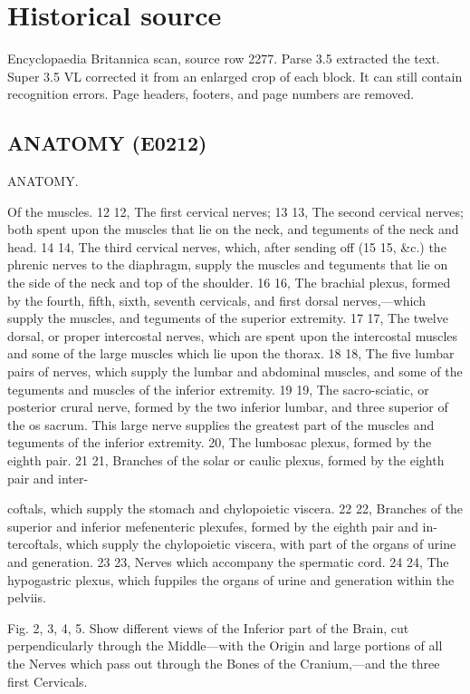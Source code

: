 \documentclass{article}
\begin{document}
\section*{Historical source}
Encyclopaedia Britannica scan, source row 2277. Parse 3.5 extracted the text. Super 3.5 VL corrected it from an enlarged crop of each block. It can still contain recognition errors.
Page headers, footers, and page numbers are removed.

\subsection*{ANATOMY (E0212)}
ANATOMY.

Of the muscles. 12 12, The first cervical nerves; 13 13, The second cervical nerves; both spent upon the muscles that lie on the neck, and teguments of the neck and head. 14 14, The third cervical nerves, which, after sending off (15 15, \&c.) the phrenic nerves to the diaphragm, supply the muscles and teguments that lie on the side of the neck and top of the shoulder. 16 16, The brachial plexus, formed by the fourth, fifth, sixth, seventh cervicals, and first dorsal nerves,—which supply the muscles, and teguments of the superior extremity. 17 17, The twelve dorsal, or proper intercostal nerves, which are spent upon the intercostal muscles and some of the large muscles which lie upon the thorax. 18 18, The five lumbar pairs of nerves, which supply the lumbar and abdominal muscles, and some of the teguments and muscles of the inferior extremity. 19 19, The sacro-sciatic, or posterior crural nerve, formed by the two inferior lumbar, and three superior of the os sacrum. This large nerve supplies the greatest part of the muscles and teguments of the inferior extremity. 20, The lumbosac plexus, formed by the eighth pair. 21 21, Branches of the solar or caulic plexus, formed by the eighth pair and inter-

coftals, which supply the stomach and chylopoietic
viscera. 22 22, Branches of the superior and inferior
mefenenteric plexufes, formed by the eighth pair and in-
tercoftals, which supply the chylopoietic viscera,
with part of the organs of urine and generation.
23 23, Nerves which accompany the spermatic cord.
24 24, The hypogastric plexus, which fuppiles the
organs of urine and generation within the pelviis.

Fig. 2, 3, 4, 5. Show different views of the Inferior part of the Brain, cut perpendicularly through the Middle—with the Origin and large portions of all the Nerves which pass out through the Bones of the Cranium,—and the three first Cervicals.
\end{document}
